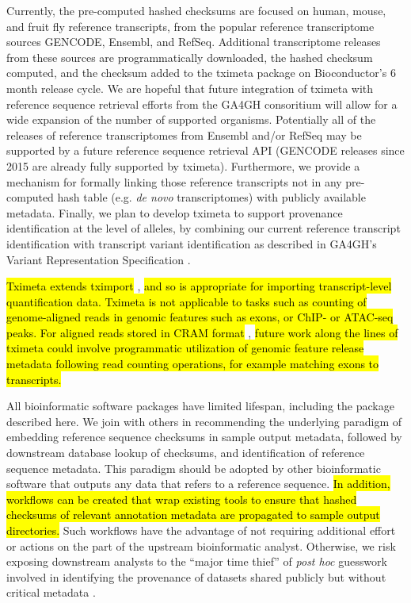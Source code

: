 Currently, the pre-computed hashed checksums are focused on human,
mouse, and fruit fly reference transcripts, from the popular reference
transcriptome sources GENCODE, Ensembl, and RefSeq. Additional
transcriptome releases from these sources are programmatically
downloaded, the hashed checksum computed, and the checksum added to
the tximeta package on Bioconductor's 6 month release cycle. We are
hopeful that future integration of tximeta with reference sequence
retrieval efforts from the GA4GH consoritium will allow for a wide
expansion of the number of supported organisms. Potentially all of the
releases of reference transcriptomes from Ensembl and/or RefSeq may be
supported by a future reference sequence retrieval API (GENCODE
releases since 2015 are already fully supported by
tximeta). Furthermore, we provide a mechanism for formally linking
those reference transcripts not in any pre-computed hash table
(e.g. \textit{de novo} transcriptomes) with publicly available
metadata. Finally, we plan to develop tximeta to support provenance
identification at the level of alleles, by combining our current
reference transcript identification with transcript variant
identification as described in GA4GH's Variant Representation
Specification \cite{vr}.

\hl{Tximeta extends tximport} \cite{tximport}, \hl{and so is
  appropriate for importing transcript-level quantification data.
  Tximeta is not applicable to tasks such as counting of
  genome-aligned reads in genomic features such as exons, or ChIP- or
  ATAC-seq peaks. For aligned reads stored in CRAM format} \cite{cram},
\hl{future work along the lines of tximeta could involve programmatic
  utilization of genomic feature release metadata following read
  counting operations, for example matching exons to transcripts.}

All bioinformatic software packages have limited lifespan, including
the package described here. We join with others in
recommending the underlying paradigm of embedding reference sequence
checksums in sample output metadata, followed by downstream database
lookup of checksums, and identification of reference sequence
metadata. This paradigm should be adopted by other bioinformatic
software that outputs any data that refers to a reference
sequence. \hl{In addition, workflows can be created that wrap existing
  tools to ensure that hashed checksums of relevant annotation
  metadata are propagated to sample output directories.}
Such workflows have the advantage of not requiring additional
effort or actions on the part of the upstream bioinformatic
analyst. Otherwise, we risk exposing downstream analysts
to the ``major time thief'' of \textit{post hoc} guesswork involved in
identifying the provenance of datasets shared publicly but without
critical metadata \cite{Kanduri2017}.

